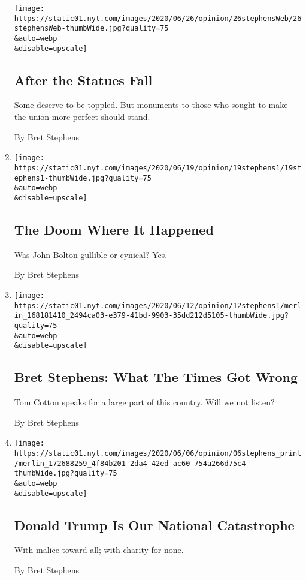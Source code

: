 \begin{enumerate}
  \texttt{[image: https://static01.nyt.com/images/2020/06/26/opinion/26stephensWeb/26stephensWeb-thumbWide.jpg?quality=75\\\&auto=webp\\\&disable=upscale]}

  \hypertarget{after-the-statues-fall}{%
  \subsection{After the Statues Fall}\label{after-the-statues-fall}}

  Some deserve to be toppled. But monuments to those who sought to make
  the union more perfect should stand.

  By Bret Stephens
\item
  \href{/2020/06/19/opinion/bolton-book.html}{}

  \texttt{[image: https://static01.nyt.com/images/2020/06/19/opinion/19stephens1/19stephens1-thumbWide.jpg?quality=75\\\&auto=webp\\\&disable=upscale]}

  \hypertarget{the-doom-where-it-happened}{%
  \subsection{The Doom Where It
  Happened}\label{the-doom-where-it-happened}}

  Was John Bolton gullible or cynical? Yes.

  By Bret Stephens
\item
  \href{/2020/06/12/opinion/tom-cotton-op-ed.html}{}

  \texttt{[image: https://static01.nyt.com/images/2020/06/12/opinion/12stephens1/merlin\_168181410\_2494ca03-e379-41bd-9903-35dd212d5105-thumbWide.jpg?quality=75\\\&auto=webp\\\&disable=upscale]}

  \hypertarget{bret-stephens-what-the-times-got-wrong}{%
  \subsection{Bret Stephens: What The Times Got
  Wrong}\label{bret-stephens-what-the-times-got-wrong}}

  Tom Cotton speaks for a large part of this country. Will we not
  listen?

  By Bret Stephens
\item
  \href{/2020/06/05/opinion/donald-trump.html}{}

  \texttt{[image: https://static01.nyt.com/images/2020/06/06/opinion/06stephens\_print/merlin\_172688259\_4f84b201-2da4-42ed-ac60-754a266d75c4-thumbWide.jpg?quality=75\\\&auto=webp\\\&disable=upscale]}

  \hypertarget{donald-trump-is-our-national-catastrophe}{%
  \subsection{Donald Trump Is Our National
  Catastrophe}\label{donald-trump-is-our-national-catastrophe}}

  With malice toward all; with charity for none.

  By Bret Stephens
\end{enumerate}


